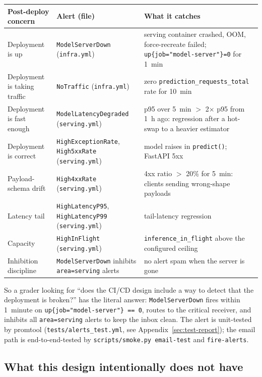 \documentclass[11pt,a4paper]{article}
\begin{document}
\begin{tabularx}{\linewidth}{@{}llX@{}}
\toprule
\textbf{Post-deploy concern} & \textbf{Alert (file)} & \textbf{What it catches} \\
\midrule
Deployment is up                  & \texttt{ModelServerDown} (\texttt{infra.yml})        & serving container crashed, OOM, force-recreate failed; \texttt{up\{job="model-server"\}=0} for 1~min \\
Deployment is taking traffic      & \texttt{NoTraffic} (\texttt{infra.yml})              & zero \texttt{prediction\_requests\_total} rate for 10~min \\
Deployment is fast enough         & \texttt{ModelLatencyDegraded} (\texttt{serving.yml}) & p95 over 5~min $>$ 2$\times$ p95 from 1~h ago: regression after a hot-swap to a heavier estimator \\
Deployment is correct             & \texttt{HighExceptionRate}, \texttt{High5xxRate} (\texttt{serving.yml}) & model raises in \texttt{predict()}; FastAPI 5xx \\
Payload-schema drift              & \texttt{High4xxRate} (\texttt{serving.yml})          & 4xx ratio $>$ 20\% for 5~min: clients sending wrong-shape payloads \\
Latency tail                      & \texttt{HighLatencyP95}, \texttt{HighLatencyP99} (\texttt{serving.yml}) & tail-latency regression \\
Capacity                          & \texttt{HighInFlight} (\texttt{serving.yml})         & \texttt{inference\_in\_flight} above the configured ceiling \\
Inhibition discipline             & \texttt{ModelServerDown} inhibits \texttt{area=serving} alerts & no alert spam when the server is gone \\
\bottomrule
\end{tabularx}

So a grader looking for ``does the CI/CD design include a way to detect that the deployment is broken?'' has the literal answer: \texttt{ModelServerDown} fires within 1~minute on \texttt{up\{job="model-server"\} == 0}, routes to the critical receiver, and inhibits all \texttt{area=serving} alerts to keep the inbox clean. The alert is unit-tested by promtool (\texttt{tests/alerts\_test.yml}, see Appendix~\ref{sec:test-report}); the email path is end-to-end-tested by \texttt{scripts/smoke.py email-test} and \texttt{fire-alerts}.

\subsection{What this design intentionally does not have}\label{sec:cicd-not}
\end{document}
